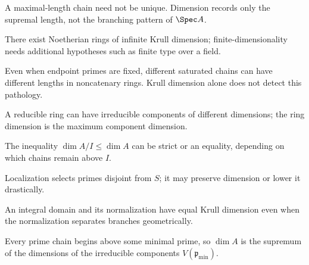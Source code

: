 \begin{example}\label{advex:vi29-01}
A maximal-length chain need not be unique.  Dimension records only the supremal length, not the branching pattern of $\Spec A$.
\end{example}

\begin{example}\label{advex:vi29-02}
There exist Noetherian rings of infinite Krull dimension; finite-dimensionality needs additional hypotheses such as finite type over a field.
\end{example}

\begin{example}\label{advex:vi29-03}
Even when endpoint primes are fixed, different saturated chains can have different lengths in noncatenary rings.  Krull dimension alone does not detect this pathology.
\end{example}

\begin{example}\label{advex:vi29-04}
A reducible ring can have irreducible components of different dimensions; the ring dimension is the maximum component dimension.
\end{example}

\begin{example}\label{advex:vi29-05}
The inequality $\dim A/I\le\dim A$ can be strict or an equality, depending on which chains remain above $I$.
\end{example}

\begin{example}\label{advex:vi29-06}
Localization selects primes disjoint from $S$; it may preserve dimension or lower it drastically.
\end{example}

\begin{example}\label{advex:vi29-07}
An integral domain and its normalization have equal Krull dimension even when the normalization separates branches geometrically.
\end{example}

\begin{example}\label{advex:vi29-08}
Every prime chain begins above some minimal prime, so $\dim A$ is the supremum of the dimensions of the irreducible components $V(\mathfrak p_{\min})$.
\end{example}

